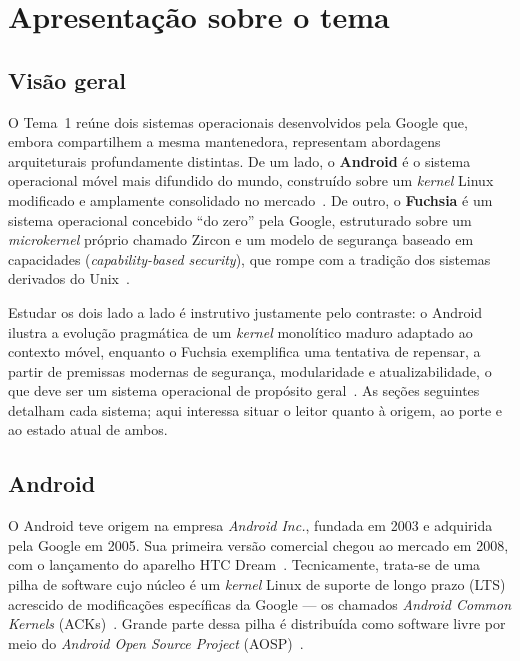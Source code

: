 \documentclass[12pt,a4paper]{article}
\begin{document}
\section{Apresentação sobre o tema}
\label{sec:apresentacao}

\subsection{Visão geral}

O Tema~1 reúne dois sistemas operacionais desenvolvidos pela Google que, embora
compartilhem a mesma mantenedora, representam abordagens arquiteturais
profundamente distintas. De um lado, o \textbf{Android} é o sistema operacional
móvel mais difundido do mundo, construído sobre um \emph{kernel} Linux modificado
e amplamente consolidado no mercado~\cite{aosp,androidsite}. De outro, o
\textbf{Fuchsia} é um sistema operacional concebido ``do zero'' pela Google,
estruturado sobre um \emph{microkernel} próprio chamado Zircon e um modelo de
segurança baseado em capacidades (\emph{capability-based security}), que rompe
com a tradição dos sistemas derivados do Unix~\cite{fuchsiadev,zircon,
fuchsia_secure}.

Estudar os dois lado a lado é instrutivo justamente pelo contraste: o Android
ilustra a evolução pragmática de um \emph{kernel} monolítico maduro adaptado ao
contexto móvel, enquanto o Fuchsia exemplifica uma tentativa de repensar, a partir
de premissas modernas de segurança, modularidade e atualizabilidade, o que deve
ser um sistema operacional de propósito geral~\cite{zircon,fuchsia_components,
fuchsia_updatable}. As seções seguintes detalham cada sistema; aqui interessa
situar o leitor quanto à origem, ao porte e ao estado atual de ambos.

\subsection{Android}

O Android teve origem na empresa \emph{Android Inc.}, fundada em 2003 e adquirida
pela Google em 2005. Sua primeira versão comercial chegou ao mercado em 2008, com
o lançamento do aparelho HTC Dream~\cite{androidwiki}. Tecnicamente, trata-se de
uma pilha de software cujo núcleo é um \emph{kernel} Linux de suporte de longo
prazo (LTS) acrescido de modificações específicas da Google --- os chamados
\emph{Android Common Kernels} (ACKs)~\cite{aospkernel}. Grande parte dessa pilha é
distribuída como software livre por meio do \emph{Android Open Source Project}
(AOSP)~\cite{aosp}.
\end{document}
